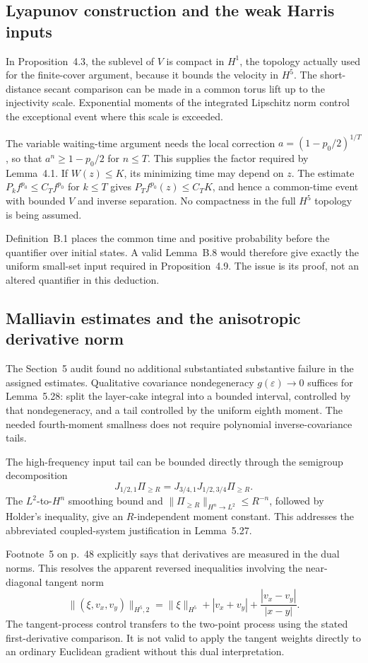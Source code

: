 \documentclass[10pt]{article}
\begin{document}
\subsection*{Lyapunov construction and the weak Harris inputs}
In Proposition 4.3, the sublevel of \(V\) is compact in \(H^1\), the topology actually used for the finite-cover argument, because it bounds the velocity in \(H^5\). The short-distance secant comparison can be made in a common torus lift up to the injectivity scale. Exponential moments of the integrated Lipschitz norm control the exceptional event where this scale is exceeded.\par
The variable waiting-time argument needs the local correction \(a=(1-p_0/2)^{1/T}\), so that \(a^n\ge1-p_0/2\) for \(n\le T\). This supplies the factor required by Lemma 4.1. If \(W(z)\le K\), its minimizing time may depend on \(z\). The estimate \(P_kf^{p_0}\le C_Tf^{p_0}\) for \(k\le T\) gives \(P_Tf^{p_0}(z)\le C_TK\), and hence a common-time event with bounded \(V\) and inverse separation. No compactness in the full \(H^5\) topology is being assumed.\par
Definition B.1 places the common time and positive probability before the quantifier over initial states. A valid Lemma B.8 would therefore give exactly the uniform small-set input required in Proposition 4.9. The issue is its proof, not an altered quantifier in this deduction.\par
\subsection*{Malliavin estimates and the anisotropic derivative norm}
The Section 5 audit found no additional substantiated substantive failure in the assigned estimates. Qualitative covariance nondegeneracy \(g(\varepsilon)\to0\) suffices for Lemma 5.28: split the layer-cake integral into a bounded interval, controlled by that nondegeneracy, and a tail controlled by the uniform eighth moment. The needed fourth-moment smallness does not require polynomial inverse-covariance tails.\par
The high-frequency input tail can be bounded directly through the semigroup decomposition \[J_{1/2,1}\Pi_{\ge R}
 =J_{3/4,1}J_{1/2,3/4}\Pi_{\ge R}.\] The \(L^2\)-to-\(H^n\) smoothing bound and \(\|\Pi_{\ge R}\|_{H^n\to L^2}\le R^{-n}\), followed by Holder’s inequality, give an \(R\)-independent moment constant. This addresses the abbreviated coupled-system justification in Lemma 5.27.\par
Footnote 5 on p. 48 explicitly says that derivatives are measured in the dual norms. This resolves the apparent reversed inequalities involving the near-diagonal tangent norm \[\|(\xi,v_x,v_y)\|_{H^5,2}
 =\|\xi\|_{H^5}+|v_x+v_y|+\frac{|v_x-v_y|}{|x-y|}.\] The tangent-process control transfers to the two-point process using the stated first-derivative comparison. It is not valid to apply the tangent weights directly to an ordinary Euclidean gradient without this dual interpretation.\par
\end{document}
